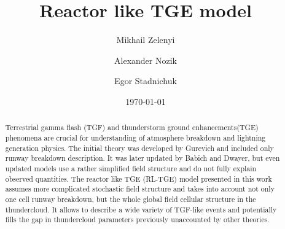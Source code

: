 \documentclass[%
 aip,
cp,  %
 amsmath,amssymb,%
 reprint,%
]{revtex4-2}
\begin{document}
\title{Reactor like TGE model}%

\author{Mikhail Zelenyi} %
%
\author{Alexander Nozik}%
\author{Egor Stadnichuk}
%


\date{\today} %

\begin{abstract}
Terrestrial gamma flash (TGF) and thunderstorm ground enhancements(TGE) phenomena are crucial for understanding of atmosphere breakdown and lightning generation physics. The initial theory was developed by Gurevich and included only runway breakdown description. It was later updated by Babich and Dwayer, but even updated models use a rather simplified field structure and do not fully explain observed quantities. The reactor like TGE (RL-TGE) model presented in this work assumes more complicated stochastic field structure and takes into account not only one cell runway breakdown, but the whole global field cellular structure in the thundercloud. It allows to describe a wide variety of TGF-like events and potentially fills the gap in thundercloud parameters previously unaccounted by other theories.
\end{abstract}

\maketitle
\end{document}
